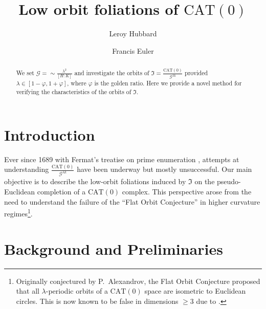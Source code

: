 \documentclass{amsart}
\title{Low orbit foliations of $\mathrm{CAT}(0)$}
\author{Leroy Hubbard}
\author{Francis Euler}
\begin{document}
\begin{abstract}
We set $\mathcal{G} = \sim\frac{\lambda^2}{[H : K]}$ and investigate the orbits of 
$\mathfrak{I} = \frac{\mathrm{CAT}(0)}{\mathcal{G}^{\lambda k}}$ 
provided $\lambda \in [1-\varphi, 1+\varphi]$, where $\varphi$ is the golden ratio. 
Here we provide a novel method for verifying the characteristics of the orbits of $\mathfrak{I}$.
\end{abstract}

\maketitle


\section{Introduction}

Ever since 1689 with Fermat's treatise on prime enumeration \cite{fermat89}, 
attempts at understanding $\frac{\mathrm{CAT}(0)}{\mathcal{G}^{\lambda k}}$ have been underway but mostly unsuccessful. 
Our main objective is to describe the low-orbit foliations induced by $\mathfrak{I}$ on 
the pseudo-Euclidean completion of a $\mathrm{CAT}(0)$ complex. 
This perspective arose from the need to %
understand the failure of the ``Flat Orbit Conjecture'' in higher curvature regimes\footnote{
Originally conjectured by P.\ Alexandrov, the Flat Orbit Conjecture proposed that all $\lambda$-periodic orbits of a $\mathrm{CAT}(0)$ space are isometric to Euclidean circles. 
This is now known to be false in dimensions $\geq 3$ due to \cite{hubard23}.}.

\section{Background and Preliminaries}
\end{document}
